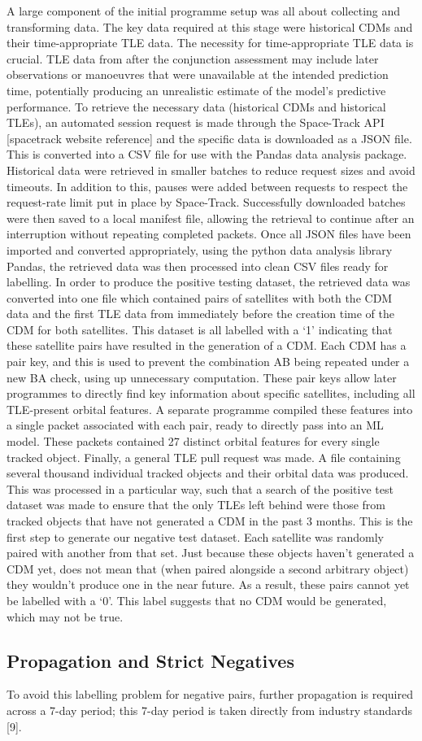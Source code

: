 A large component of the initial programme setup was all about collecting and transforming data. The key data required at this stage were historical CDMs and their time-appropriate TLE data. The necessity for time-appropriate TLE data is crucial. TLE data from after the conjunction assessment may include later observations or manoeuvres that were unavailable at the intended prediction time, potentially producing an unrealistic estimate of the model’s predictive performance.
To retrieve the necessary data (historical CDMs and historical TLEs), an automated session request is made through the Space-Track API [spacetrack website reference] and the specific data is downloaded as a JSON file. This is converted into a CSV file for use with the Pandas data analysis package. Historical data were retrieved in smaller batches to reduce request sizes and avoid timeouts. In addition to this, pauses were added between requests to respect the request-rate limit put in place by Space-Track. Successfully downloaded batches were then saved to a local manifest file, allowing the retrieval to continue after an interruption without repeating completed packets. 
Once all JSON files have been imported and converted appropriately, using the python data analysis library Pandas, the retrieved data was then processed into clean CSV files ready for labelling. In order to produce the positive testing dataset, the retrieved data was converted into one file which contained pairs of satellites with both the CDM data and the first TLE data from immediately before the creation time of the CDM for both satellites. This dataset is all labelled with a ‘1’ indicating that these satellite pairs have resulted in the generation of a CDM. 
Each CDM has a pair key, and this is used to prevent the combination AB being repeated under a new BA check, using up unnecessary computation. These pair keys allow later programmes to directly find key information about specific satellites, including all TLE-present orbital features. A separate programme compiled these features into a single packet associated with each pair, ready to directly pass into an ML model. These packets contained 27 distinct orbital features for every single tracked object. 
Finally, a general TLE pull request was made. A file containing several thousand individual tracked objects and their orbital data was produced. This was processed in a particular way, such that a search of the positive test dataset was made to ensure that the only TLEs left behind were those from tracked objects that have not generated a CDM in the past 3 months. This is the first step to generate our negative test dataset. Each satellite was randomly paired with another from that set. Just because these objects haven’t generated a CDM yet, does not mean that (when paired alongside a second arbitrary object) they wouldn’t produce one in the near future. As a result, these pairs cannot yet be labelled with a ‘0’. This label suggests that no CDM would be generated, which may not be true.

\subsection{Propagation and Strict Negatives}

To avoid this labelling problem for negative pairs, further propagation is required across a 7-day period; this 7-day period is taken directly from industry standards [9].